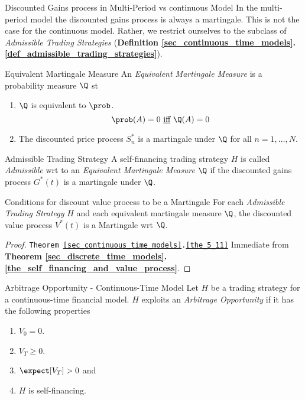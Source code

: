 \documentclass[11pt,a4paper]{article}
\begin{document}
  \begin{remark}{Discounted Gains process in Multi-Period vs continuous Model}
    In the multi-period model the discounted gains process is always a martingale. This is not the case for the continuous model. Rather,  we restrict ourselves to the subclass of \textit{Admissible Trading Strategies} (\textbf{Definition \ref{sec_continuous_time_models}.\ref{def_admissible_trading_strategies}}).
  \end{remark}

  \begin{definition}{Equivalent Martingale Measure}
    An \textit{Equivalent Martingale Measure} is a probability measure $\Q$ st
    \begin{enumerate}
      \item $\Q$ is equivalent to $\prob$.
      \[ \prob(A)=0\text{ \underline{iff} }\Q(A)=0 \]
      \item The discounted price process $S_n^*$ is a martingale under $\Q$ for all $n=1,\dots,N$.
    \end{enumerate}
  \end{definition}

  \begin{definition}{Admissible Trading Strategy}\label{def_admissible_trading_strategies}
    A self-financing trading strategy $H$ is called \textit{Admissible} wrt to an \textit{Equivalent Martingale Measure} $\Q$ if the discounted gains process $G^*(t)$ is a martingale under $\Q$.
  \end{definition}

  \begin{theorem}{Conditions for discount value process to be a Martingale}\label{the_5_11}
    For each \textit{Admissible Trading Strategy} $H$ and each equivalent martingale measure $\Q$, the discounted value process $V^*(t)$ is a Martingale wrt $\Q$.
  \end{theorem}

  \begin{proof}{\texttt{Theorem \ref{sec_continuous_time_models}.\ref{the_5_11}} }
    Immediate from \textbf{Theorem \ref{sec_discrete_time_models}.\ref{the_self_financing_and_value_process}}.
  \end{proof}

  \begin{definition}{Arbitrage Opportunity - Continuous-Time Model}
    Let $H$ be a trading strategy for a continuous-time financial model. $H$ exploits an \textit{Arbitrage Opportunity} if it has the following properties
    \begin{enumerate}
      \item $V_0=0$.
      \item $V_T\geq0$.
      \item $\expect[V_T]>0$ and
      \item $H$ is self-financing.
    \end{enumerate}
  \end{definition}
\end{document}
